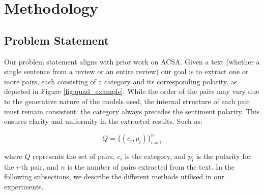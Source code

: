 \documentclass[11pt]{article}
\begin{document}






\section{Methodology}

\subsection{Problem Statement}
Our problem statement aligns with prior work on ACSA. Given a text (whether a single sentence from a review or an entire review) our goal is to extract one or more pairs, each consisting of a category and its corresponding polarity, as depicted in Figure \ref{fig:quad_example}. While the order of the pairs may vary due to the generative nature of the models used, the internal structure of each pair must remain consistent: the category always precedes the sentiment polarity. This ensures clarity and uniformity in the extracted results. Such as:

\begin{equation}
    Q = \{(c_i, p_i)\}_{i=1}^n
\end{equation}

where \(Q\) represents the set of pairs, \(c_i\) is the category, and \(p_i\) is the polarity for the \(i\)-th pair, and \(n\) is the number of pairs extracted from the text. In the following subsections, we describe the different methods utilised in our experiments.


\end{document}
